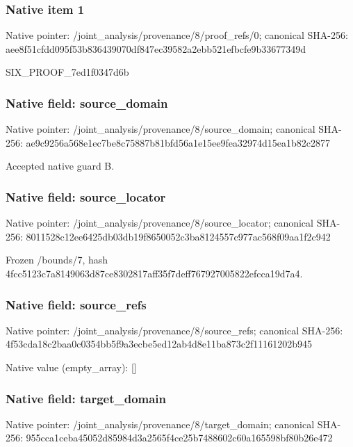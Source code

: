 \documentclass[10pt,a4paper]{article}
\begin{document}
\subsubsection{Native item 1}
Native pointer: /joint\_\allowbreak{}analysis/provenance/8/proof\_\allowbreak{}refs/0; canonical SHA-256: aee8f51cfdd095f53b836439070df847ec39582a2ebb521efbcfe9b33677349d

\begingroup\raggedright\sloppy SIX\_\allowbreak{}PROOF\_\allowbreak{}7ed1f0347d6b\par\endgroup

\subsubsection{Native field: source\_\allowbreak{}domain}
Native pointer: /joint\_\allowbreak{}analysis/provenance/8/source\_\allowbreak{}domain; canonical SHA-256: ae9c9256a568e1ec7be8c75887b81bfd56a1e15ee9fea32974d15ea1b82c2877

\begingroup\raggedright\sloppy Accepted native guard B.\par\endgroup

\subsubsection{Native field: source\_\allowbreak{}locator}
Native pointer: /joint\_\allowbreak{}analysis/provenance/8/source\_\allowbreak{}locator; canonical SHA-256: 8011528c12ee6425db03db19f8650052c3ba8124557c977ac568f09aa1f2c942

\begingroup\raggedright\sloppy Frozen /\allowbreak{}bounds/\allowbreak{}7,\allowbreak{} hash 4fcc5123c7a8149063d87ce8302817aff35f7deff767927005822efcca19d7a4.\par\endgroup

\subsubsection{Native field: source\_\allowbreak{}refs}
Native pointer: /joint\_\allowbreak{}analysis/provenance/8/source\_\allowbreak{}refs; canonical SHA-256: 4f53cda18c2baa0c0354bb5f9a3ecbe5ed12ab4d8e11ba873c2f11161202b945

Native value (empty\_\allowbreak{}array): []

\subsubsection{Native field: target\_\allowbreak{}domain}
Native pointer: /joint\_\allowbreak{}analysis/provenance/8/target\_\allowbreak{}domain; canonical SHA-256: 955cca1ceba45052d85984d3a2565f4ce25b7488602c60a165598bf80b26e472
\end{document}
